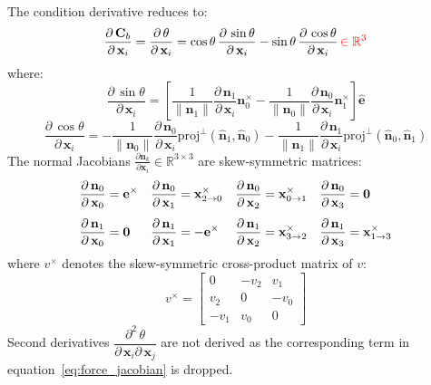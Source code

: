 \documentclass{article}
\newcommand{\pd}[2]{\dfrac{\partial\, #1}{\partial\, #2}}
\newcommand{\pdm}[3]{\dfrac{\partial^2\, #1}{\partial\, #2 \partial\, #3}}
\newcommand{\drop}[1]{\textcolor{red}{#1}}
\begin{document}
\noindent The condition derivative reduces to:
\begin{equation}
\pd{\mathbf{C}_b}{\mathbf{x}_i} = \pd{\theta}{\mathbf{x}_i} = 
    \cos\theta\,\pd{\sin\theta}{\mathbf{x}_i} - 
    \sin\theta\,\pd{\cos\theta}{\mathbf{x}_i}
    \, \drop{\in \mathbb{R}^3}
\end{equation}
where:
\begin{equation}
\pd{\sin\theta}{\mathbf{x}_i} = 
\left[ 
    \frac{1}{\|\mathbf{n}_1\|}\pd{\mathbf{n}_1}{\mathbf{x}_i}\mathbf{n}_0^{\times} -
    \frac{1}{\|\mathbf{n}_0\|}\pd{\mathbf{n}_0}{\mathbf{x}_i}\mathbf{n}_1^{\times}
\right]\hat{\mathbf{e}}
\end{equation}
\begin{equation}
\pd{\cos\theta}{\mathbf{x}_i} =  
    -\frac{1}{\|\mathbf{n}_0\|}\pd{\mathbf{n}_0}{\mathbf{x}_i} 
        \text{proj}^{\perp}(\hat{\mathbf{n}}_1, \hat{\mathbf{n}}_0) -
    \frac{1}{\|\mathbf{n}_1\|}\pd{\mathbf{n}_1}{\mathbf{x}_i} 
        \text{proj}^{\perp}(\hat{\mathbf{n}}_0, \hat{\mathbf{n}}_1)
\end{equation}
The normal Jacobians $\frac{\partial \mathbf{n}_k}{\partial \mathbf{x}_i} \in \mathbb{R}^{3\times3}$ are skew-symmetric matrices:
\begin{equation}
\begin{alignedat}{4}
    &\pd{\mathbf{n}_0}{\mathbf{x}_0} = \mathbf{e}^{\times} \quad& 
    &\pd{\mathbf{n}_0}{\mathbf{x}_1} = \vrel{2}{0}^{\times} \quad&
    &\pd{\mathbf{n}_0}{\mathbf{x}_2} = \vrel{0}{1}^{\times} \quad&
    &\pd{\mathbf{n}_0}{\mathbf{x}_3} = \mathbf{0}           \\[1ex]
    &\pd{\mathbf{n}_1}{\mathbf{x}_0} = \mathbf{0} \quad& 
    &\pd{\mathbf{n}_1}{\mathbf{x}_1} = -\mathbf{e}^{\times} \quad&
    &\pd{\mathbf{n}_1}{\mathbf{x}_2} = \vrel{3}{2}^{\times} \quad&
    &\pd{\mathbf{n}_1}{\mathbf{x}_3} = \vrel{1}{3}^{\times}
\end{alignedat}
\end{equation}
where $v^{\times}$ denotes the skew-symmetric cross-product matrix of $v$:
\begin{equation*}
v^\times = 
\begin{bmatrix}
     0  & -v_2 &  v_1 \\
     v_2&    0 & -v_0 \\
    -v_1&  v_0 &    0
\end{bmatrix}
\end{equation*}
Second derivatives $\pdm{\theta}{\mathbf{x}_i}{\mathbf{x}_j}$ are not derived as the corresponding term in equation~\ref{eq:force_jacobian} is dropped.
\end{document}
